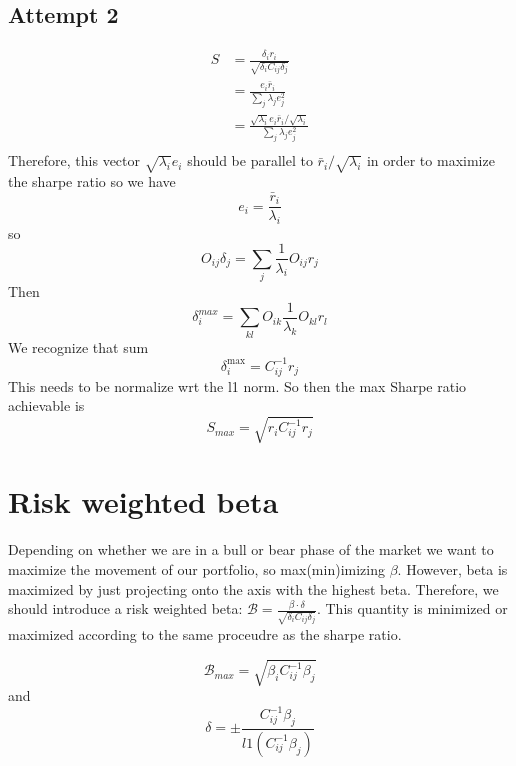 \documentclass[10pt,letterpaper,oneside]{article}
\begin{document}
\subsection{Attempt 2}
\begin{equation}
\begin{split}
S&=\frac{\delta_i r_i}{\sqrt{\delta_i C_{ij}\delta_j}}\\
&=\frac{e_i \bar{r}_i}{\sum_j \lambda_j e_j^2}\\
&=\frac{\sqrt{\lambda_i}e_i \bar{r}_i/\sqrt{\lambda_i}}{\sum_j \lambda_j e_j^2}\\
\end{split}
\end{equation}
Therefore, this vector $\sqrt{\lambda_i}e_i$ should be parallel to $\bar{r}_i/\sqrt{\lambda_i}$ in order to maximize the sharpe ratio
so we have
\begin{equation}
e_i=\frac{\bar{r}_i}{\lambda_i}
\end{equation}
so
\begin{equation}
O_{ij}\delta_j=\sum_j \frac{1}{\lambda_i}O_{i j}r_j
\end{equation}
Then
\begin{equation}
\delta^{max}_{i}=\sum_{k l}O_{i k}\frac{1}{\lambda_k}O_{k l}r_l
\end{equation}
We recognize that sum
\begin{equation}
\delta^{\max}_{i}=C^{-1}_{ij}r_j
\end{equation}
This needs to be normalize wrt the l1 norm.
So then the max Sharpe ratio achievable is
\begin{equation}
S_{max}=\sqrt{r_i C^{-1}_{ij}r_j}
\end{equation}
\section{Risk weighted beta}
Depending on whether we are in a bull or bear phase of the market we want to maximize the movement of our portfolio, so max(min)imizing $\beta$. However, beta is maximized by just projecting onto the axis with the highest beta. Therefore, we should introduce a risk weighted beta: $\mathcal{B}=\frac{\beta \cdot \delta}{\sqrt{\delta_i C_{ij}\delta_j}}$. This quantity is minimized or maximized according to the same proceudre as the sharpe ratio.

\begin{equation}
\mathcal{B}_{max}=\sqrt{\beta_i C^{-1}_{ij}\beta_j}
\end{equation}
and
\begin{equation}
\delta=\pm \frac{C^{-1}_{ij}\beta_j}{l1(C^{-1}_{ij}\beta_j)}
\end{equation}
\end{document}
